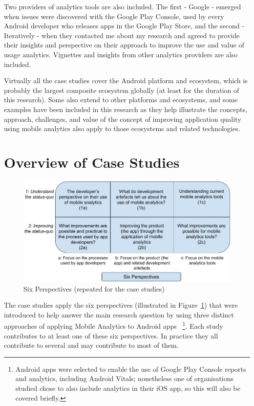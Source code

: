 Two providers of analytics tools are also included. The first - Google - emerged when issues were discovered with the Google Play Console, used by every Android developer who releases apps in the Google Play Store, and the second - Iteratively - when they contacted me about my research and agreed to provide their insights and perspective on their approach to improve the use and value of usage analytics. Vignettes and insights from other analytics providers are also included. 

Virtually all the case studies cover the Android platform and ecosystem, which is probably the largest composite ecosystem globally (at least for the duration of this research). Some also extend to other platforms and ecosystems, and some examples have been included in this research as they help illustrate the concepts, approach, challenges, and value of the concept of improving application quality using mobile analytics also apply to those ecosystems and related technologies.



\clearpage
\section{Overview of Case Studies}
\label{section-overview-of-case-studies}
\begin{figure}
    \centering
    \includegraphics[width=15cm]{images/my/six-perspectives-2x3-matrix-03-nov-2021.jpeg}
    \caption{Six Perspectives (repeated for the case studies)}
    \label{fig:six-perspectives-in-case-studies}
\end{figure}


The case studies apply the six perspectives (illustrated in Figure~\ref{fig:six-perspectives-in-case-studies}) that were introduced to help answer the main research question by using three distinct approaches of applying Mobile Analytics to Android apps
~\footnote{Android apps were selected to enable the use of Google Play Console reports and analytics, including Android Vitals; nonetheless one of organisations studied chose to also include analytics in their iOS app, so this will also be covered briefly.}. Each study contributes to at least one of these six perspectives. In practice they all contribute to several and may contribute to most of them. 

